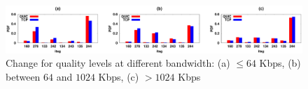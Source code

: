 \begin{figure}[!t]
	\captionsetup[subfigure]{}
	\begin{center}
		\includegraphics[width=0.8\linewidth]{img/plotdata/PDF/itag/plot_itag_pdf_bucket123}
		\caption{\label{fig:quality_change}Change for quality levels at different bandwidth: (a) $\leq 64$ Kbps, (b)  between $64$ and $1024$ Kbps, (c) $> 1024$ Kbps}
	\end{center}
\end{figure}

